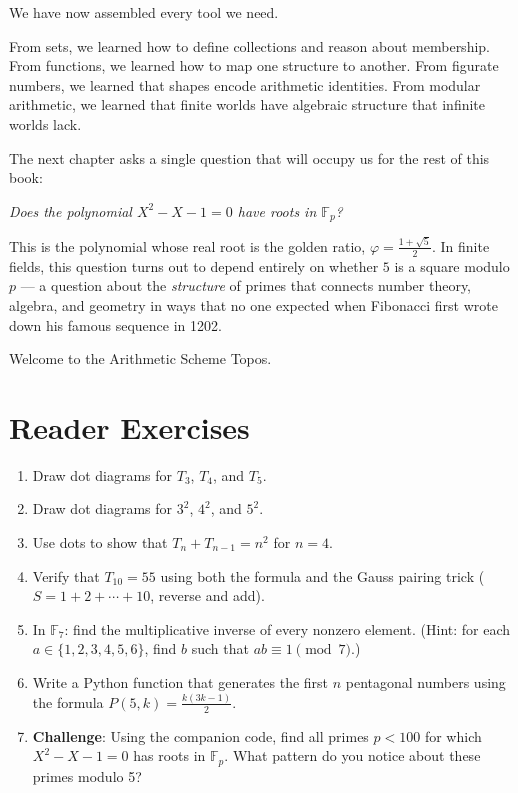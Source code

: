 We have now assembled every tool we need.

From sets, we learned how to define collections and reason about membership.
From functions, we learned how to map one structure to another. From figurate
numbers, we learned that shapes encode arithmetic identities. From modular
arithmetic, we learned that finite worlds have algebraic structure that
infinite worlds lack.

The next chapter asks a single question that will occupy us for the rest of
this book:

\begin{center}
\emph{Does the polynomial $X^2 - X - 1 = 0$ have roots in $\mathbb{F}_p$?}
\end{center}

\noindent This is the polynomial whose real root is the golden ratio,
$\varphi = \frac{1 + \sqrt{5}}{2}$. In finite fields, this question turns out
to depend entirely on whether $5$ is a square modulo $p$ --- a question
about the \emph{structure} of primes that connects number theory, algebra,
and geometry in ways that no one expected when Fibonacci first wrote down his
famous sequence in 1202.

Welcome to the Arithmetic Scheme Topos.


\section*{Reader Exercises}

\begin{enumerate}
    \item Draw dot diagrams for $T_3$, $T_4$, and $T_5$.

    \item Draw dot diagrams for $3^2$, $4^2$, and $5^2$.

    \item Use dots to show that $T_n + T_{n-1} = n^2$ for $n = 4$.

    \item Verify that $T_{10} = 55$ using both the formula and the Gauss
          pairing trick ($S = 1 + 2 + \cdots + 10$, reverse and add).

    \item In $\mathbb{F}_7$: find the multiplicative inverse of every nonzero
          element. (Hint: for each $a \in \{1,2,3,4,5,6\}$, find $b$ such
          that $ab \equiv 1 \pmod{7}$.)

    \item Write a Python function that generates the first $n$ pentagonal
          numbers using the formula $P(5, k) = \frac{k(3k-1)}{2}$.

    \item \textbf{Challenge}: Using the companion code, find all primes $p <
          100$ for which $X^2 - X - 1 = 0$ has roots in $\mathbb{F}_p$.
          What pattern do you notice about these primes modulo 5?
\end{enumerate}

